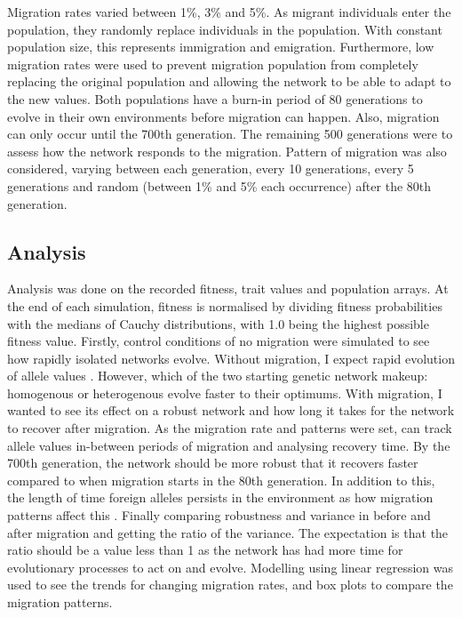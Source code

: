 Migration rates varied between 1\%, 3\% and 5\%. As migrant individuals enter the population, they randomly replace individuals in the population. With constant population size, this represents immigration and emigration. Furthermore, low migration rates were used to prevent migration population from completely replacing the original population and allowing the network to be able to adapt to the new values. Both populations have a burn-in period of 80 generations to evolve in their own environments before migration can happen. Also, migration can only occur until the 700th generation. The remaining 500 generations were to assess how the network responds to the migration. Pattern of migration was also considered, varying between each generation, every 10 generations, every 5 generations and random (between 1\% and 5\% each occurrence) after the 80th generation.
\subsection{Analysis}
Analysis was done on the recorded fitness, trait values and population arrays. At the end of each simulation, fitness is normalised by dividing fitness probabilities with the medians of Cauchy distributions, with 1.0 being the highest possible fitness value. Firstly, control conditions of no migration were simulated to see how rapidly isolated networks evolve. Without migration, I expect rapid evolution of allele values \cite{garcia1997genetic}. However, which of the two starting genetic network makeup: homogenous or heterogenous evolve faster to their optimums. With migration, I wanted to see its effect on a robust network and how long it takes for the network to recover after migration. As the migration rate and patterns were set, can track allele values in-between periods of migration and analysing recovery time. By the 700th generation, the network should be more robust that it recovers faster compared to when migration starts in the 80th generation. In addition to this, the length of time foreign alleles persists in the environment as how migration patterns affect this \cite{w2004dispersal}. Finally comparing robustness and variance in before and after migration and getting the ratio of the variance. The expectation is that the ratio should be a value less than 1 as the network has had more time for evolutionary processes to act on and evolve. Modelling using linear regression was used to see the trends for changing migration rates, and box plots to compare the migration patterns.
